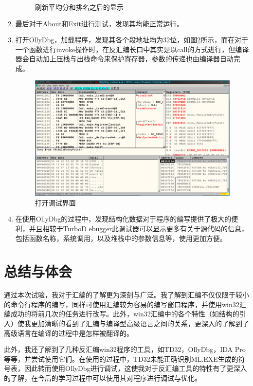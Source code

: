 \documentclass{article}
\begin{document}
\begin{enumerate}
\begin{figure}[H]
				\caption{刷新平均分和排名之后的显示}
				\label{fig:secondShow}
			\end{figure}
		\item 最后对于About和Exit进行测试，发现其均能正常运行。
		\item 打开OllyDbg，加载程序，发现其各个段地址均为32位，如图\ref{fig:dbg1}所示，而在对于一个函数进行invoke操作时，在反汇编长口中其实是以call的方式进行，但编译器会自动加上压栈与出栈命令来保护寄存器，参数的传递也由编译器自动完成。
			\begin{figure}[H]
				\centering
				\includegraphics[width=0.95\linewidth]{res/homework_5/dbg1.png}
				\caption{打开调试界面}
				\label{fig:dbg1}
			\end{figure}
		\item 在使用OllyDbg的过程中，发现结构化数据对于程序的编写提供了极大的便利，并且相较于TurboD ebugger此调试器可以显示更多有关于源代码的信息，包括函数名称，系统调用，以及堆栈中的参数信息等，使用更加方便。
	\end{enumerate}

	\section{总结与体会}
	通过本次试验，我对于汇编的了解更为深刻与广泛。我了解到汇编不仅仅限于较小的命令行程序的编写，同样可使用汇编较为容易的编写窗口程序，并使用win32汇编成功的将前几次的任务进行改写。此外，win32汇编中的各个特性（如结构的引入）使我更加清晰的看到了汇编与编译型高级语言之间的关系，更深入的了解到了高级语言在编译的过程中是怎样被翻译的。\par
	此外，我还了解到了几种反汇编win32程序的工具，如TD32，OllyDbg，IDA Pro等等，并尝试使用它们。在使用的过程中，TD32未能正确识别ML.EXE生成的符号表，因此转而使用OllyDbg进行调试，这使我对于反汇编工具的特性有了更深入的了解，在今后的学习过程中可以使用其对程序进行调试与优化。
\end{document}
